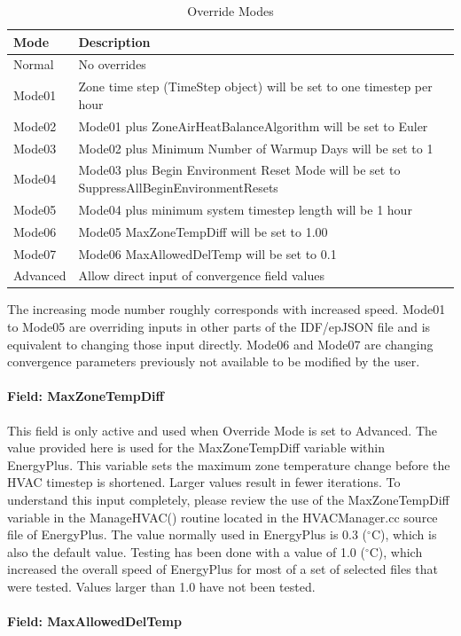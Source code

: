 \begin{longtable}[c]{p{1.5in}p{5.0in}}
\caption{Override Modes\label{table:override_modes}} \tabularnewline
\toprule
Mode & Description \tabularnewline
\midrule
\endfirsthead

Normal & No overrides\tabularnewline
Mode01 & Zone time step (TimeStep object) will be set to one timestep per hour\tabularnewline
Mode02 & Mode01 plus ZoneAirHeatBalanceAlgorithm will be set to Euler\tabularnewline
Mode03 & Mode02 plus Minimum Number of Warmup Days will be set to 1\tabularnewline
Mode04 & Mode03 plus Begin Environment Reset Mode will be set to SuppressAllBeginEnvironmentResets\tabularnewline
Mode05 & Mode04 plus minimum system timestep length will be 1 hour\tabularnewline
Mode06 & Mode05 MaxZoneTempDiff will be set to 1.00\tabularnewline
Mode07 & Mode06 MaxAllowedDelTemp will be set to 0.1\tabularnewline
Advanced& Allow direct input of convergence field values\tabularnewline

\bottomrule
\end{longtable}

The increasing mode number roughly corresponds with increased speed. Mode01 to Mode05 are overriding inputs in other parts of the IDF/epJSON file and is equivalent to changing those input directly. Mode06 and Mode07 are changing convergence parameters previously not available to be modified by the user.

\paragraph{Field: MaxZoneTempDiff}\label{max-zone-temp-diff}

This field is only active and used when Override Mode is set to Advanced. The value provided here is used for the MaxZoneTempDiff variable within EnergyPlus. This variable sets the maximum zone temperature change before the HVAC timestep is shortened. Larger values result in fewer iterations. To understand this input completely, please review the use of the MaxZoneTempDiff variable in the ManageHVAC() routine located in the HVACManager.cc source file of EnergyPlus. The value normally used in EnergyPlus is 0.3 ($^\circ$C), which is also the default value. Testing has been done with a value of 1.0 ($^\circ$C), which increased the overall speed of EnergyPlus for most of a set of selected files that were tested. Values larger than 1.0 have not been tested.

\paragraph{Field: MaxAllowedDelTemp}\label{max-allowed-del-temp}

